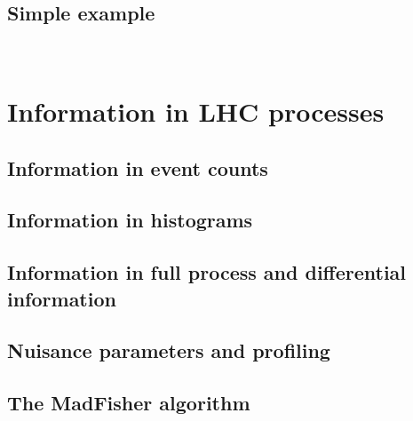 \subsection{Simple example}

~

\section{Information in LHC processes}
\label{sec:information_madfisher}

\subsection{Information in event counts}

\subsection{Information in histograms}

\subsection{Information in full process and differential information}

\subsection{Nuisance parameters and profiling}

\subsection{The MadFisher algorithm}

